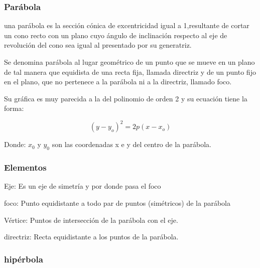     \subsubsection*{Parábola} \label{Parábola}

    una parábola  es la sección cónica de excentricidad
    igual a 1,resultante de cortar un cono recto con un plano cuyo
    ángulo de inclinación respecto al eje de revolución del cono sea igual al
    presentado por su generatriz.

    Se denomina parábola al lugar geométrico de un punto que se mueve en un
    plano de tal manera que equidista de una recta fija, llamada directriz y de
    un punto fijo en el plano, que no pertenece a la parábola ni a la
    directriz, llamado foco.

    Su gráfica es muy parecida a la del polinomio de orden 2 y su ecuación tiene
    la forma:

    $$ (y-y_o)^2 =2p(x-x_o) $$

    Donde: $x_0$ y $y_0$ son las coordenadas x e y del centro de la parábola.

    \subsubsection*{Elementos} \label{Elementos}

    Eje: Es un eje de simetría y por donde pasa el foco

    foco: Punto equidistante a todo par de puntos (simétricos)  de la parábola

    Vértice: Puntos de intersección de la parábola con el eje.

    directriz: Recta equidistante a los puntos de la parábola.





    \subsubsection*{hipérbola} \label{hipérbola}

